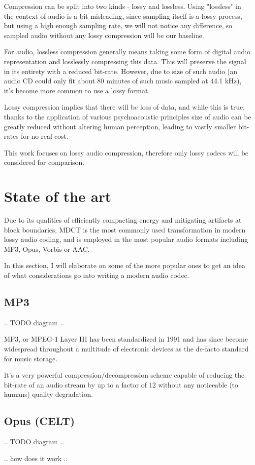 Compression can be split into two kinds - lossy and lossless. Using "lossless" in the context of audio is a bit misleading, since sampling itself is a lossy process, but using a high enough sampling rate, we will not notice any difference, so sampled audio without any lossy compression will be our baseline.

For audio, lossless compression generally means taking some form of digital audio representation and losslessly compressing this data. This will preserve the signal in its entirety with a reduced bit-rate. However, due to size of such audio (an audio CD could only fit about 80 minutes of such music sampled at 44.1 kHz), it's become more common to use a lossy format.

Lossy compression implies that there will be loss of data, and while this is true, thanks to the application of various psychoacoustic principles size of audio can be greatly reduced without altering human perception, leading to vastly smaller bit-rates for no real cost.

This work focuses on lossy audio compression, therefore only lossy codecs will be considered for comparison.

\section{State of the art}
Due to its qualities of efficiently compacting energy and mitigating artifacts at block boundaries, MDCT is the most commonly used transformation in modern lossy audio coding, and is employed in the most popular audio formats including MP3, Opus, Vorbis or AAC.

In this section, I will elaborate on some of the more popular ones to get an idea of what considerations go into writing a modern audio codec.

\subsection{MP3}
.. TODO diagram ..

MP3, or MPEG-1 Layer III has been standardized in 1991 and has since become widespread throughout a multitude of electronic devices as the de-facto standard for music storage.

It's a very powerful compression/decompression scheme capable of reducing the bit-rate of an audio stream by up to a factor of 12 without any noticeable (to humans) quality degradation. \cite{Raissi2002TheTB}


\subsection{Opus (CELT)}
.. TODO diagram ..

.. how does it work ..